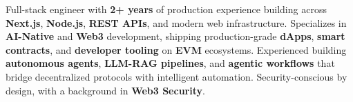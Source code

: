 \documentclass[letter,10pt]{article}
\begin{document}
Full-stack engineer with \textbf{2+ years} of production experience building across \textbf{Next.js}, \textbf{Node.js}, \textbf{REST APIs}, and modern web infrastructure. Specializes in \textbf{AI-Native} and \textbf{Web3} development, shipping production-grade \textbf{dApps}, \textbf{smart contracts}, and \textbf{developer tooling} on \textbf{EVM} ecosystems. Experienced building \textbf{autonomous agents}, \textbf{LLM-RAG pipelines}, and \textbf{agentic workflows} that bridge decentralized protocols with intelligent automation. Security-conscious by design, with a background in \textbf{Web3 Security}.
\end{document}
